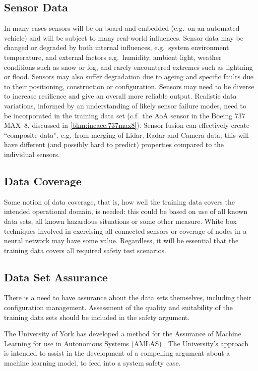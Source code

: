 \subsection{Sensor Data}
In many cases sensors will be on-board and embedded (e.g.\ on an automated vehicle) and will be subject to many real-world influences. Sensor data may be changed or degraded by both internal influences, e.g.\ system environment temperature, and external factors e.g.\ humidity, ambient light, weather conditions such as snow or fog, and rarely encountered extremes such as lightning or flood. 
Sensors may also suffer degradation due to ageing and specific faults due to their positioning, construction or configuration. Sensors may need to be diverse to increase resilience and give an overall more reliable output. Realistic data variations, informed by an understanding of likely sensor failure modes, need to be incorporated in the training data set (c.f.\ the AoA sensor in the Boeing 737 MAX~8, discussed in \autoref{bkm:incacc:737max8}).
Sensor fusion can effectively create ``composite data'', e.g.\ from merging of Lidar, Radar and Camera data; this will have different (and possibly hard to predict) properties compared to the individual sensors.

\subsection{Data Coverage}
Some notion of data coverage, that is, how well the training data covers the intended operational domain, is needed: this could be based on use of all known data sets, all known hazardous situations or some other measure. White box techniques involved in exercising all connected sensors or coverage of nodes in a neural network may have some value. Regardless, it will be essential that the training data covers all required safety test scenarios.

\subsection{Data Set Assurance}
There is a need to have assurance about the data sets themselves, including their configuration management. Assessment of the quality and suitability of the training data sets should be included in the safety argument.

The University of York has developed a method for the Assurance of Machine Learning for use in Autonomous Systems (AMLAS)
\cite{citation:machinelearning:amlas}.
The University's approach is intended to assist in the development of a compelling argument about a machine learning model,
to feed into a system safety case.

